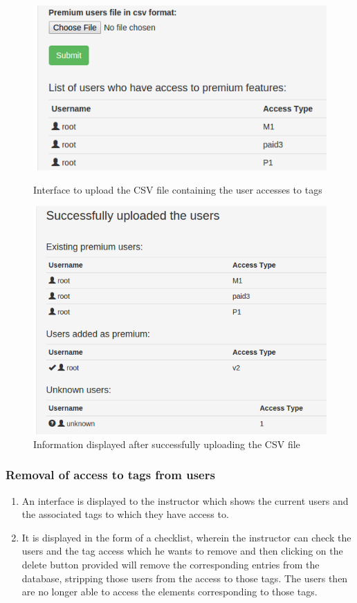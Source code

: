 \begin{figure}
\centering
\includegraphics[width=0.7\linewidth]{./media/CSVupload}
\caption{Interface to upload the CSV file containing the user accesses to tags}
\label{fig:CSVupload}
\vspace{1cm}
\includegraphics[width=0.7\linewidth]{./media/usertaguploadsuccess}
\caption{Information displayed after successfully uploading the CSV file}
\label{fig:usertaguploadsuccess}
\end{figure}

\subsubsection{Removal of access to tags from users}

\begin{enumerate}
	\item An interface is displayed to the instructor which shows the current users and the associated tags to which they have access to.
	\item It is displayed in the form of a checklist, wherein the instructor can check the users and the tag access which he wants to remove and then clicking on the delete button provided will remove the corresponding entries from the database, stripping those users from the access to those tags. The users then are no longer able to access the elements corresponding to those tags.
\end{enumerate}

